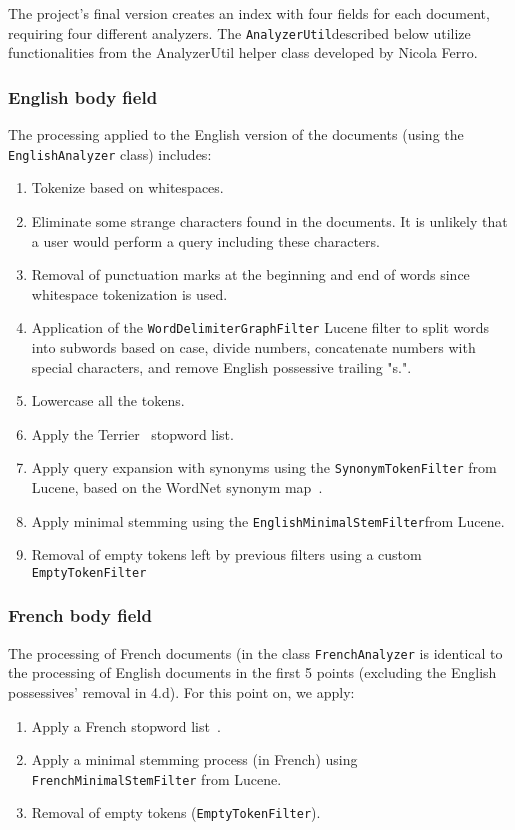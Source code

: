 The project's final version creates an index with four fields for each document, requiring four different analyzers. 
The \texttt{AnalyzerUtil}described below utilize functionalities from the AnalyzerUtil helper class developed by Nicola Ferro.\\

\subsubsection{English body field}
The processing applied to the English version of the documents (using the \texttt{EnglishAnalyzer} class) includes:
\begin{enumerate}
    \item Tokenize based on whitespaces.
    \item Eliminate some strange characters found in the documents. It is unlikely that a user would perform a query 
    including these characters.
    \item Removal of punctuation marks at the beginning and end of words since whitespace tokenization is used.
    \item Application of the \texttt{WordDelimiterGraphFilter} Lucene filter to split words into subwords based on case, 
    divide numbers, concatenate numbers with special characters, and remove English possessive trailing "s.".
    \item Lowercase all the tokens.
    \item Apply the Terrier~\cite{OunisEtAl2006} stopword list.
    \item Apply query expansion with synonyms using the \texttt{SynonymTokenFilter} from Lucene, based on the WordNet 
    synonym map~\cite{wordnet}. 
    \item Apply minimal stemming using the \texttt{EnglishMinimalStemFilter}from Lucene.  
    \item Removal of empty tokens left by previous filters using a custom \texttt{EmptyTokenFilter}
\end{enumerate}

\subsubsection{French body field}
The processing of French documents (in the class \texttt{FrenchAnalyzer} is identical to the processing of English 
documents in the first 5 points (excluding the English possessives’ removal in 4.d). For this point on, we apply: 
\begin{enumerate}[start=6]
    \item Apply a French stopword list~\cite{stopword_french}.
    \item Apply a minimal stemming process (in French) using \texttt{FrenchMinimalStemFilter} from Lucene.
    \item Removal of empty tokens (\texttt{EmptyTokenFilter}).
\end{enumerate}

